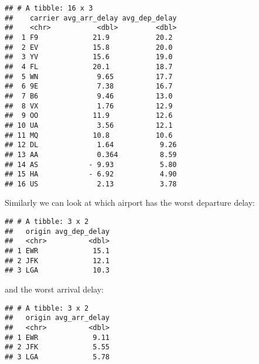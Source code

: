 \documentclass[]{article}
\newenvironment{Shaded}{\begin{snugshade}}{\end{snugshade}}
\newcommand{\KeywordTok}[1]{\textcolor[rgb]{0.13,0.29,0.53}{\textbf{#1}}}
\newcommand{\DataTypeTok}[1]{\textcolor[rgb]{0.13,0.29,0.53}{#1}}
\newcommand{\StringTok}[1]{\textcolor[rgb]{0.31,0.60,0.02}{#1}}
\newcommand{\OtherTok}[1]{\textcolor[rgb]{0.56,0.35,0.01}{#1}}
\newcommand{\OperatorTok}[1]{\textcolor[rgb]{0.81,0.36,0.00}{\textbf{#1}}}
\newcommand{\NormalTok}[1]{#1}
\theoremstyle{definition}
\theoremstyle{definition}
\theoremstyle{definition}
\theoremstyle{remark}
\begin{document}
\begin{verbatim}
## # A tibble: 16 x 3
##    carrier avg_arr_delay avg_dep_delay
##    <chr>           <dbl>         <dbl>
##  1 F9             21.9           20.2 
##  2 EV             15.8           20.0 
##  3 YV             15.6           19.0 
##  4 FL             20.1           18.7 
##  5 WN              9.65          17.7 
##  6 9E              7.38          16.7 
##  7 B6              9.46          13.0 
##  8 VX              1.76          12.9 
##  9 OO             11.9           12.6 
## 10 UA              3.56          12.1 
## 11 MQ             10.8           10.6 
## 12 DL              1.64           9.26
## 13 AA              0.364          8.59
## 14 AS            - 9.93           5.80
## 15 HA            - 6.92           4.90
## 16 US              2.13           3.78
\end{verbatim}

Similarly we can look at which airport has the worst departure delay:

\begin{Shaded}
\end{Shaded}

\begin{verbatim}
## # A tibble: 3 x 2
##   origin avg_dep_delay
##   <chr>          <dbl>
## 1 EWR             15.1
## 2 JFK             12.1
## 3 LGA             10.3
\end{verbatim}

and the worst arrival delay:

\begin{Shaded}
\end{Shaded}

\begin{verbatim}
## # A tibble: 3 x 2
##   origin avg_arr_delay
##   <chr>          <dbl>
## 1 EWR             9.11
## 2 JFK             5.55
## 3 LGA             5.78
\end{verbatim}
\end{document}
